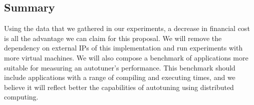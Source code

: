 \subsection{Summary}
\label{sec:cloud-conclusion}

Using the data that we gathered in our experiments, a decrease in financial
cost is all the advantage we can claim for this proposal. We will remove the
dependency on external IPs of this implementation and run experiments with more
virtual machines. We will also compose a benchmark of applications more
suitable for measuring an autotuner's performance.  This benchmark should
include applications with a range of compiling and executing times, and we
believe it will reflect better the capabilities of autotuning using distributed
computing.
